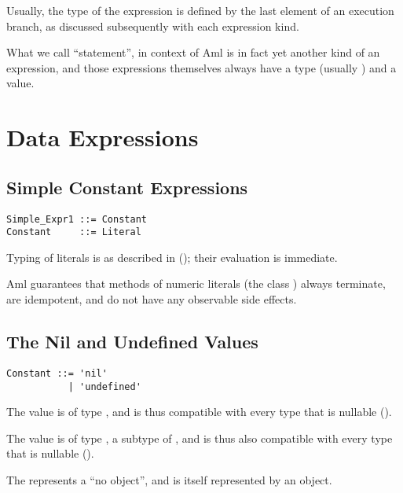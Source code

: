Usually, the type of the expression is defined by the last element of an execution branch, as discussed subsequently with each expression kind. 

What we call ``statement'', in context of Aml is in fact yet another kind of an expression, and those expressions themselves always have a type (usually ) and a value. 





\section{Data Expressions}





\subsection{Simple Constant Expressions}
\label{sec:literal-expr}

\syntax\begin{lstlisting}
Simple_Expr1 ::= Constant
Constant     ::= Literal
\end{lstlisting}

Typing of literals is as described in (); their evaluation is immediate. 

Aml guarantees that methods of numeric literals (the class ) always terminate, are idempotent, and do not have any observable side effects. 







\subsection{The Nil and Undefined Values}

\syntax\begin{lstlisting}
Constant ::= 'nil'
           | 'undefined'
\end{lstlisting}

The  value is of type , and is thus compatible with every type that is nullable ().

The  value is of type , a subtype of , and is thus also compatible with every type that is nullable (). 

The  represents a ``no object'', and is itself represented by an object. 

